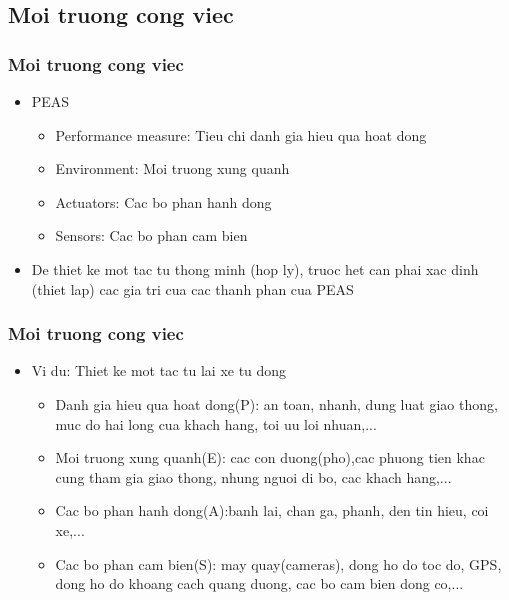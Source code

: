 \documentclass[12pt]{beamer}
\begin{document}
\subsection{Moi truong cong viec}
\begin{frame}
\frametitle{Moi truong cong viec}
\begin{itemize}
    \item PEAS\\
    \begin{itemize}
        \item Performance measure: Tieu chi danh gia hieu qua hoat dong\\
        \item Environment: Moi truong xung quanh\\
        \item Actuators: Cac bo phan hanh dong\\
        \item Sensors: Cac bo phan cam bien\\
    \end{itemize}
    \item De thiet ke mot tac tu thong minh (hop ly), truoc het can phai xac dinh (thiet lap) cac gia tri cua cac thanh phan cua  PEAS\\
\end{itemize}
\end{frame}
\begin{frame}
\frametitle{Moi truong cong viec}
\begin{itemize}
    \item Vi du: Thiet ke mot tac tu lai xe tu dong\\
    \begin{itemize}
        \item Danh gia hieu qua hoat dong(P): an toan, nhanh, dung luat giao thong, muc do hai long cua khach hang, toi uu loi nhuan,...\\
        \item Moi truong xung quanh(E): cac con duong(pho),cac phuong tien khac cung tham gia giao thong, nhung nguoi di bo, cac khach hang,...\\
        \item Cac bo phan hanh dong(A):banh lai, chan ga, phanh, den tin hieu, coi xe,...\\
        \item Cac bo phan cam bien(S): may quay(cameras), dong ho do toc do, GPS, dong ho do khoang cach quang duong, cac bo cam bien dong co,...\\
    \end{itemize}
\end{itemize}
\end{frame}
\end{document}
